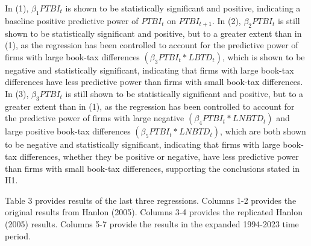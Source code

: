 \documentclass{article}
\begin{document}
In (1), $\beta_1PTBI_t$ is shown to be statistically significant and positive, indicating a baseline positive predictive power of $PTBI_t$ on $PTBI_{t+1}$. In (2), $\beta_2PTBI_t$ is still shown to be statistically significant and positive, but to a greater extent than in (1), as the regression has been controlled to account for the predictive power of firms with large book-tax differences $(\beta_3PTBI_t * LBTD_t)$, which is shown to be negative and statistically significant, indicating that firms with large book-tax differences have less predictive power than firms with small book-tax differences. In (3), $\beta_3PTBI_t$ is still shown to be statistically significant and positive, but to a greater extent than in (1), as the regression has been controlled to account for the predictive power of firms with large negative $(\beta_4PTBI_t * LNBTD_t)$ and large positive book-tax differences $(\beta_5PTBI_t * LNBTD_t)$, which are both shown to be negative and statistically significant, indicating that firms with large book-tax differences, whether they be positive or negative, have less predictive power than firms with small book-tax differences, supporting the conclusions stated in H1.

Table 3 provides results of the last three regressions. Columns 1-2 provides the original results from Hanlon (2005). Columns 3-4 provides the replicated Hanlon (2005) results. Columns 5-7 provide the results in the expanded 1994-2023 time period. 
\end{document}
